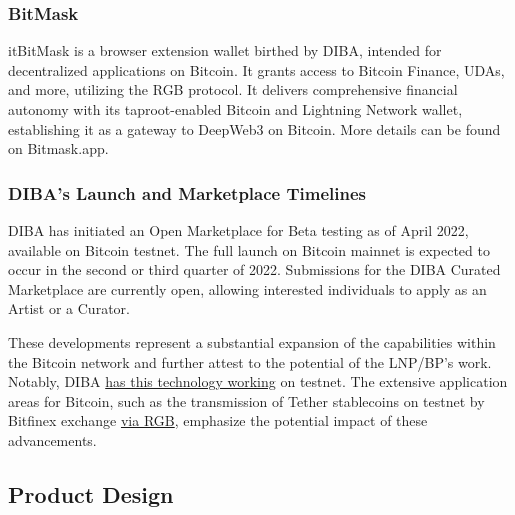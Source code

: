 \subsubsection{BitMask}
it{BitMask} is a browser extension wallet birthed by DIBA, intended for decentralized applications on Bitcoin. It grants access to Bitcoin Finance, UDAs, and more, utilizing the RGB protocol. It delivers comprehensive financial autonomy with its taproot-enabled Bitcoin and Lightning Network wallet, establishing it as a gateway to DeepWeb3 on Bitcoin. More details can be found on Bitmask.app.\par
\subsubsection{DIBA's Launch and Marketplace Timelines}
DIBA has initiated an Open Marketplace for Beta testing as of April 2022, available on Bitcoin testnet. The full launch on Bitcoin mainnet is expected to occur in the second or third quarter of 2022. Submissions for the DIBA Curated Marketplace are currently open, allowing interested individuals to apply as an Artist or a Curator.\par
These developments represent a substantial expansion of the capabilities within the Bitcoin network and further attest to the potential of the LNP/BP's work. Notably, DIBA \href{https://diba.io/}{has this technology working} on testnet. The extensive application areas for Bitcoin, such as the transmission of Tether stablecoins on testnet by Bitfinex exchange \href{https://github.com/RGB-Tools/rgb-lightning-sample}{via RGB}, emphasize the potential impact of these advancements.
\subsection{Product Design}
